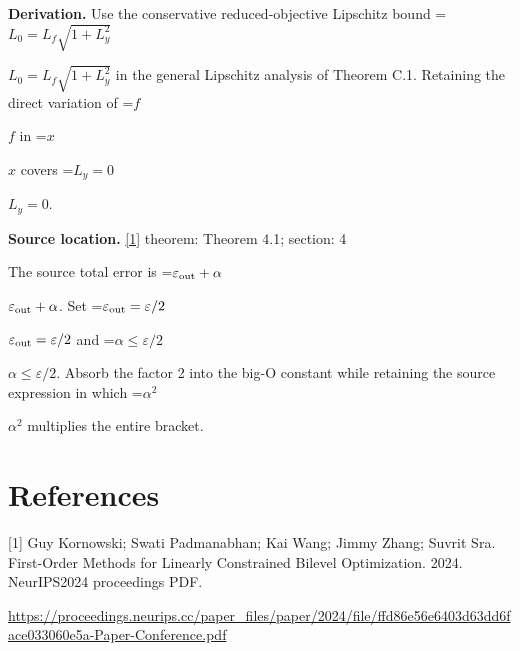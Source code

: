 \documentclass[10pt,a4paper]{article}
\newcommand{\AtlasMath}[1]{\par\begingroup\centering\setbox0=\hbox{$\displaystyle #1$}\ifdim\wd0>1.4\linewidth\typeout{ATLAS WIDE FORMULA: \the\wd0}\fi\ifdim\wd0>\linewidth\resizebox{\linewidth}{!}{\box0}\else\box0\fi\par\endgroup}
\newcommand{\AtlasInlineMath}[1]{\begingroup\setbox0=\hbox{$#1$}\ifdim\wd0>.4\linewidth\endgroup\AtlasMath{#1}\else\endgroup$#1$\fi}
\begin{document}
\textbf{Derivation.} Use the conservative reduced-objective Lipschitz bound \AtlasInlineMath{L_0=L_f\sqrt{1+L_y^2}} in the general Lipschitz analysis of Theorem C.1. Retaining the direct variation of \AtlasInlineMath{f} in \AtlasInlineMath{x} covers \AtlasInlineMath{L_y=0}.

\textbf{Source location.} \href{https://proceedings.neurips.cc/paper_files/paper/2024/file/ffd86e56e6403d63dd6face033060e5a-Paper-Conference.pdf}{[1]} theorem: Theorem 4.1; section: 4

The source total error is \AtlasInlineMath{\varepsilon_{\rm out}+\alpha}. Set \AtlasInlineMath{\varepsilon_{\rm out}=\varepsilon/2} and \AtlasInlineMath{\alpha\le\varepsilon/2}. Absorb the factor 2 into the big-O constant while retaining the source expression in which \AtlasInlineMath{\alpha^2} multiplies the entire bracket.

\section{References}
[1] Guy Kornowski; Swati Padmanabhan; Kai Wang; Jimmy Zhang; Suvrit Sra. First-Order Methods for Linearly Constrained Bilevel Optimization. 2024. NeurIPS2024 proceedings PDF.

\url{https://proceedings.neurips.cc/paper_files/paper/2024/file/ffd86e56e6403d63dd6face033060e5a-Paper-Conference.pdf}
\end{document}
